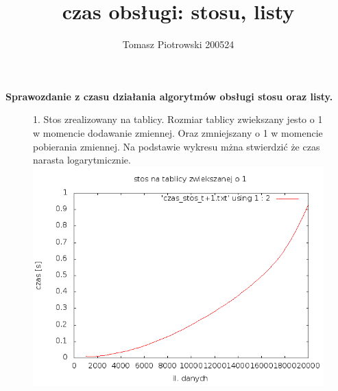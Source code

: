 \documentclass[a4paper,11pt]{report}
\title{czas obsługi: stosu, listy}
\author{Tomasz Piotrowski 200524}
\begin{document}
\maketitle

\textbf {\Large{ Sprawozdanie z czasu działania algorytmów  obsługi stosu oraz listy. }}



\begin{figure}
  \begin{center}
  1. Stos zrealizowany na tablicy. Rozmiar tablicy zwiekszany jesto o 1 w momencie dodawanie zmiennej. Oraz zmniejszany o 1 w momencie pobierania zmiennej. Na podstawie wykresu mżna stwierdzić że czas narasta logarytmicznie. 
    \includegraphics[scale=0.5]{./czas_stos_t+1.png}
    \label{fig:}
    \caption{}
  \end{center}
\end{figure}
\end{document}
